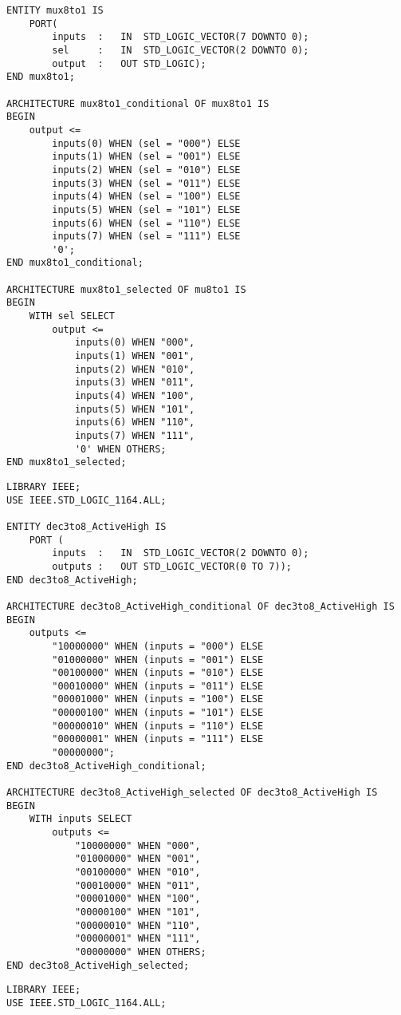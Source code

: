 \begin{enumerate}
\begin{minipage}{1\linewidth}
\begin{lstlisting}
ENTITY mux8to1 IS
	PORT(
		inputs	:	IN	STD_LOGIC_VECTOR(7 DOWNTO 0);		
		sel		:	IN	STD_LOGIC_VECTOR(2 DOWNTO 0);
		output	:	OUT	STD_LOGIC);
END mux8to1;

ARCHITECTURE mux8to1_conditional OF mux8to1 IS
BEGIN
	output <=
		inputs(0) WHEN (sel = "000") ELSE
		inputs(1) WHEN (sel = "001") ELSE
		inputs(2) WHEN (sel = "010") ELSE
		inputs(3) WHEN (sel = "011") ELSE
		inputs(4) WHEN (sel = "100") ELSE
		inputs(5) WHEN (sel = "101") ELSE
		inputs(6) WHEN (sel = "110") ELSE
		inputs(7) WHEN (sel = "111") ELSE
		'0';
END mux8to1_conditional;

ARCHITECTURE mux8to1_selected OF mu8to1 IS
BEGIN
	WITH sel SELECT
		output <=
			inputs(0) WHEN "000",
			inputs(1) WHEN "001",
			inputs(2) WHEN "010",
			inputs(3) WHEN "011",
			inputs(4) WHEN "100",
			inputs(5) WHEN "101",
			inputs(6) WHEN "110",
			inputs(7) WHEN "111",
			'0' WHEN OTHERS;
END mux8to1_selected;
		\end{lstlisting}
	\end{minipage}

	\begin{minipage}{1\linewidth}
		\item
		\begin{lstlisting}
LIBRARY IEEE;
USE IEEE.STD_LOGIC_1164.ALL;

ENTITY dec3to8_ActiveHigh IS
	PORT (
		inputs	:	IN	STD_LOGIC_VECTOR(2 DOWNTO 0);
		outputs	:	OUT	STD_LOGIC_VECTOR(0 TO 7));
END dec3to8_ActiveHigh;

ARCHITECTURE dec3to8_ActiveHigh_conditional OF dec3to8_ActiveHigh IS
BEGIN
	outputs <=
		"10000000" WHEN (inputs = "000") ELSE
		"01000000" WHEN (inputs = "001") ELSE
		"00100000" WHEN (inputs = "010") ELSE
		"00010000" WHEN (inputs = "011") ELSE
		"00001000" WHEN (inputs = "100") ELSE
		"00000100" WHEN (inputs = "101") ELSE
		"00000010" WHEN (inputs = "110") ELSE
		"00000001" WHEN (inputs = "111") ELSE
		"00000000";
END dec3to8_ActiveHigh_conditional;

ARCHITECTURE dec3to8_ActiveHigh_selected OF dec3to8_ActiveHigh IS
BEGIN
	WITH inputs SELECT
		outputs <=
			"10000000" WHEN "000",
			"01000000" WHEN "001",
			"00100000" WHEN "010",
			"00010000" WHEN "011",
			"00001000" WHEN "100",
			"00000100" WHEN "101",
			"00000010" WHEN "110",
			"00000001" WHEN "111",
			"00000000" WHEN OTHERS;
END dec3to8_ActiveHigh_selected;
		\end{lstlisting}
	\end{minipage}

	\begin{minipage}{1\linewidth}
		\item 
		\begin{lstlisting}
LIBRARY IEEE;
USE IEEE.STD_LOGIC_1164.ALL;


\end{lstlisting}
\end{minipage}
\end{enumerate}

